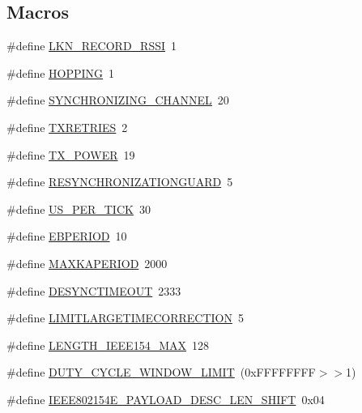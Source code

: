 \subsection*{Macros}
\begin{DoxyCompactItemize}
\item 
\#define \hyperlink{group___i_e_e_e802154_e_ga98a9bd9a997faec550b48a22690ba0e1}{L\+K\+N\+\_\+\+R\+E\+C\+O\+R\+D\+\_\+\+R\+S\+SI}~1
\item 
\#define \hyperlink{group___i_e_e_e802154_e_ga495914ac755e3089a99e6a6946c12971}{H\+O\+P\+P\+I\+NG}~1
\item 
\#define \hyperlink{group___i_e_e_e802154_e_gaf8be83417584fa06ecb6982f183bd222}{S\+Y\+N\+C\+H\+R\+O\+N\+I\+Z\+I\+N\+G\+\_\+\+C\+H\+A\+N\+N\+EL}~20
\item 
\#define \hyperlink{group___i_e_e_e802154_e_ga2ad5d0a4cdd37feb8c5e52db2978062f}{T\+X\+R\+E\+T\+R\+I\+ES}~2
\item 
\#define \hyperlink{group___i_e_e_e802154_e_ga8bc4773990d12a21438d91a86890b0db}{T\+X\+\_\+\+P\+O\+W\+ER}~19
\item 
\#define \hyperlink{group___i_e_e_e802154_e_gafe48704d22af1082dd51b6e9440c718e}{R\+E\+S\+Y\+N\+C\+H\+R\+O\+N\+I\+Z\+A\+T\+I\+O\+N\+G\+U\+A\+RD}~5
\item 
\#define \hyperlink{group___i_e_e_e802154_e_ga9b8d0ee5ecddb6b100d1c4b1e39affb0}{U\+S\+\_\+\+P\+E\+R\+\_\+\+T\+I\+CK}~30
\item 
\#define \hyperlink{group___i_e_e_e802154_e_ga911ff2fd825b4361a4c994ab69d712f4}{E\+B\+P\+E\+R\+I\+OD}~10
\item 
\#define \hyperlink{group___i_e_e_e802154_e_gaf23ff997a0ba4295ef3233674da5706d}{M\+A\+X\+K\+A\+P\+E\+R\+I\+OD}~2000
\item 
\#define \hyperlink{group___i_e_e_e802154_e_ga44bb385ed0db31e2751672455577e2d7}{D\+E\+S\+Y\+N\+C\+T\+I\+M\+E\+O\+UT}~2333
\item 
\#define \hyperlink{group___i_e_e_e802154_e_gade29b5db9a15c57a45f7b1efc5d8ae52}{L\+I\+M\+I\+T\+L\+A\+R\+G\+E\+T\+I\+M\+E\+C\+O\+R\+R\+E\+C\+T\+I\+ON}~5
\item 
\#define \hyperlink{group___i_e_e_e802154_e_ga9a7b61ef1c132acb8422f4132585ad8c}{L\+E\+N\+G\+T\+H\+\_\+\+I\+E\+E\+E154\+\_\+\+M\+AX}~128
\item 
\#define \hyperlink{group___i_e_e_e802154_e_gabb72bb7a2001ef5d2f490d606227b5d5}{D\+U\+T\+Y\+\_\+\+C\+Y\+C\+L\+E\+\_\+\+W\+I\+N\+D\+O\+W\+\_\+\+L\+I\+M\+IT}~(0x\+F\+F\+F\+F\+F\+F\+F\+F$>$$>$1)
\item 
\#define \hyperlink{group___i_e_e_e802154_e_ga3fce44aa170845de2b5e884456d6681a}{I\+E\+E\+E802154\+E\+\_\+\+P\+A\+Y\+L\+O\+A\+D\+\_\+\+D\+E\+S\+C\+\_\+\+L\+E\+N\+\_\+\+S\+H\+I\+FT}~0x04
$$
\end{DoxyCompactItemize}
